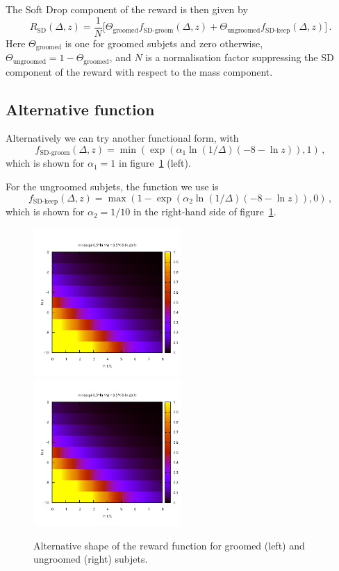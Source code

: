 \documentclass[12pt,twoside]{article}
\begin{document}
The Soft Drop component of the reward is then given by
\begin{equation}
  \label{eq:SD-reward}
  R_\text{SD}(\Delta, z) =
  \frac{1}{N}\big[\Theta_{\text{groomed}} f_\text{SD-groom}(\Delta, z)
  + \Theta_\text{ungroomed} f_\text{SD-keep}(\Delta, z)\big]\,.  
\end{equation}
Here $\Theta_\text{groomed}$ is one for groomed subjets and zero
otherwise, $\Theta_\text{ungroomed} = 1 - \Theta_\text{groomed}$, and
$N$ is a normalisation factor suppressing the SD component of the
reward with respect to the mass component.

\subsection{Alternative function}
Alternatively we can try another functional form, with
\begin{equation}
  \label{eq:groom-rew}
  f_{\text{SD-groom}}(\Delta, z) =
  \min(\exp(\alpha_ 1 \ln(1/\Delta) (-8-\ln z)),1)\,,
\end{equation}
which is shown for $\alpha_1=1$ in figure~\ref{fig:SD-reward-shape-alt}
(left).

For the ungroomed subjets, the function we use is
\begin{equation}
  \label{eq:keep-rew}
  f_{\text{SD-keep}}(\Delta, z) =
  \max(1 - \exp(\alpha_2 \ln(1/\Delta)(-8-\ln z)),0)\,,
\end{equation}
which is shown for $\alpha_2=1/10$ in the right-hand side of
figure~\ref{fig:SD-reward-shape-alt}.

\begin{figure}
  \centering
  \includegraphics[width=0.5\textwidth,page=3]{SD-reward-test}%
  \includegraphics[width=0.5\textwidth,page=4]{SD-reward-test}%
  \caption{Alternative shape of the reward function for groomed (left)
    and ungroomed (right) subjets.}
  \label{fig:SD-reward-shape-alt}
\end{figure}
\end{document}
